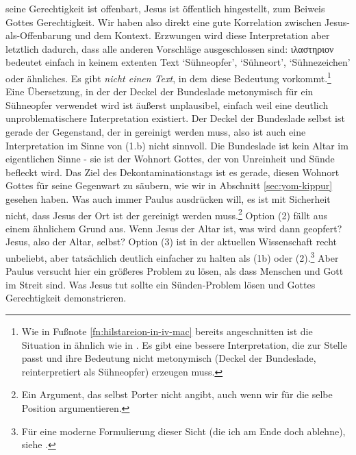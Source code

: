 seine Gerechtigkeit ist offenbart, Jesus ist öffentlich hingestellt, zum Beiweis Gottes Gerechtigkeit.
Wir haben also direkt eine gute Korrelation zwischen Jesus-als-Offenbarung und dem Kontext.
Erzwungen wird diese Interpretation aber letztlich dadurch, dass alle anderen Vorschläge ausgeschlossen sind:
ιλαστηριον bedeutet einfach in keinem extenten Text `Sühneopfer', `Sühneort', `Sühnezeichen' oder ähnliches.
Es gibt \textit{nicht einen Text}, in dem diese Bedeutung vorkommt.\footnote{
	Wie in Fußnote \ref{fn:hilstareion-in-iv-mac} bereits angeschnitten ist die Situation in  ähnlich wie in .
	Es gibt eine bessere Interpretation, die zur Stelle passt und ihre Bedeutung nicht metonymisch (Deckel der Bundeslade, reinterpretiert als Sühneopfer) erzeugen muss.
}
Eine Übersetzung, in der der Deckel der Bundeslade metonymisch für ein Sühneopfer verwendet wird ist äußerst unplausibel,
einfach weil eine deutlich unproblematischere Interpretation existiert.
Der Deckel der Bundeslade selbst ist gerade der Gegenstand, der in  gereinigt werden muss,
also ist auch eine Interpretation im Sinne von (1.b) nicht sinnvoll.
Die Bundeslade ist kein Altar im eigentlichen Sinne - sie ist der Wohnort Gottes, der von Unreinheit und Sünde befleckt wird.
Das Ziel des Dekontaminationstags ist es gerade, diesen Wohnort Gottes für seine Gegenwart zu säubern, wie wir in Abschnitt \ref{sec:yom-kippur} gesehen haben.
Was auch immer Paulus ausdrücken will, es ist mit Sicherheit nicht, dass Jesus der Ort ist der gereinigt werden muss.\footnote{
	Ein Argument, das selbst Porter nicht angibt, auch wenn wir für die selbe Position argumentieren.
}
Option (2) fällt aus einem ähnlichem Grund aus. Wenn Jesus der Altar ist, was wird dann geopfert? Jesus, also der Altar, selbst?
Option (3) ist in der aktuellen Wissenschaft recht unbeliebt, aber tatsächlich deutlich einfacher zu halten als (1b) oder (2).\footnote{
	Für eine moderne Formulierung dieser Sicht (die ich am Ende doch ablehne), siehe \Cite[259ff]{lamb-of-the-free}.
}
Aber Paulus versucht hier ein größeres Problem zu lösen, als dass Menschen und Gott im Streit sind.
Was Jesus tut sollte ein Sünden-Problem lösen und Gottes Gerechtigkeit demonstrieren.

